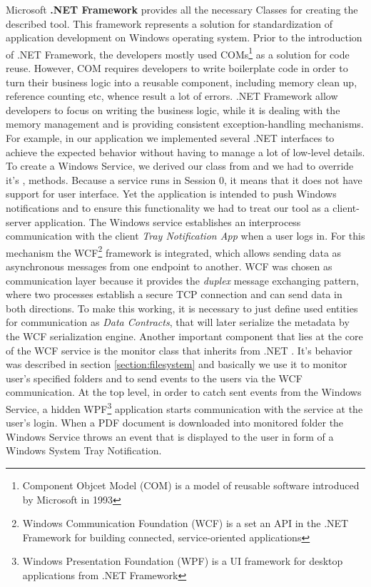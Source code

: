 Microsoft \textbf{.NET Framework} provides all the necessary Classes for creating the described tool. This framework represents a solution for standardization of application development on Windows operating system. Prior to the introduction of .NET Framework, the developers mostly used COMs\footnote{Component Objcet Model (COM) is a model of reusable software introduced by Microsoft in 1993} as a solution for code reuse. However, COM requires developers to write boilerplate code in order to turn their business logic into a reusable component, including memory clean up, reference counting etc, whence result a lot of errors. .NET Framework allow developers to focus on writing the business logic, while it is dealing with the memory management and is providing consistent exception-handling mechanisms. For example, in our application we implemented several .NET interfaces to achieve the expected behavior without having to manage a lot of low-level details. To create a Windows Service, we derived our class from  and we had to override it's ,  methods. Because a service runs in Session 0, it means that it does not have support for user interface. Yet the application is intended to push Windows notifications and to ensure this functionality we had to treat our tool as a client-server application. The Windows service establishes an interprocess communication with the client \textit{Tray Notification App} when a user logs in. For this mechanism the WCF\footnote{Windows Communication Foundation (WCF) is a set an API in the .NET Framework for building connected, service-oriented applications} framework is integrated, which allows sending data as asynchronous messages from one endpoint to another. WCF was chosen as communication layer because it provides the \textit{duplex} message exchanging pattern, where two processes establish a secure TCP connection and can send data in both directions. To make this working, it is necessary to just define used entities for communication as \textit{Data Contracts}, that will later serialize the metadata by the WCF serialization engine. Another important component that lies at the core of the WCF service is the monitor class that inherits from .NET . It's behavior was described in section \ref{section:filesystem} and basically we use it to monitor user's specified folders and to send events to the users via the WCF communication. At the top level, in order to catch sent events from the Windows Service, a hidden WPF\footnote{Windows Presentation Foundation (WPF) is a UI framework for desktop applications from .NET Framework} application starts communication with the service at the user's login. When a PDF document is downloaded into monitored folder the Windows Service throws an event that is displayed to the user in form of a Windows System Tray Notification.


